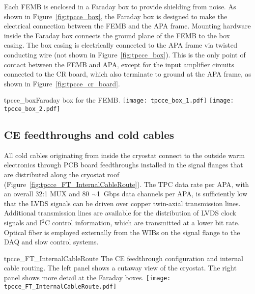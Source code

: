 Each FEMB is enclosed in a Faraday box to provide shielding from noise. 
As shown in Figure~\ref{fig:tpcce_box}, the Faraday box is designed to make the electrical connection 
between the FEMB and the APA frame. %
 Mounting 
hardware inside the Faraday box connects the ground plane of the FEMB to the box casing. The
box casing is electrically connected to the APA frame via twisted conducting wire (not 
shown in Figure~\ref{fig:tpcce_box}). This is the only point of contact between the FEMB and
APA, except for the input amplifier circuits connected to the CR board, which also terminate to
ground at the APA frame, as shown in Figure~\ref{fig:tpcce_cr_board}.

\begin{cdrfigure}{tpcce_box}{Faraday box for the FEMB.}
\texttt{[image: tpcce\_box\_1.pdf]}
\texttt{[image: tpcce\_box\_2.pdf]}
\end{cdrfigure}

%
\subsection{CE feedthroughs and cold cables}
\label{subsec:ce_feedthrough}

All cold cables originating from inside the cryostat connect to the outside warm electronics through PCB board feedthroughs
installed in the signal flanges that are distributed along the cryostat roof (Figure~\ref{fig:tpcce_FT_InternalCableRoute}).
The TPC data rate per APA, with an overall 32:1 MUX and 80 $\sim$1~Gbps data channels per APA,
is sufficiently low that the LVDS signals can be driven over copper twin-axial transmission lines.
Additional transmission lines are available for the distribution of LVDS clock signals and I$^2$C control information,
which are transmitted at a lower bit rate.
Optical fiber is employed externally from the WIBs on the signal flange to the DAQ and slow control systems.

\begin{cdrfigure}{tpcce_FT_InternalCableRoute}{
The CE feedthrough configuration and internal cable routing. The left panel shows a cutaway view of the cryostat.
The right panel shows more detail at the Faraday boxes.}
\texttt{[image: tpcce\_FT\_InternalCableRoute.pdf]}
\end{cdrfigure}



